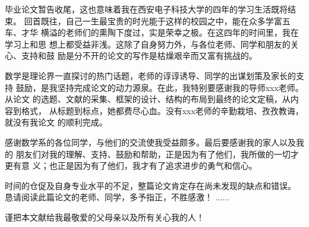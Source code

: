 
\begin{thanks}

毕业论文暂告收尾，这也意味着我在西安电子科技大学的四年的学习生活既将结束。
回首既往，自己一生最宝贵的时光能于这样的校园之中，能在众多学富五车、才华
横溢的老师们的熏陶下度过，实是荣幸之极。在这四年的时间里，我在学习上和思
想上都受益非浅。这除了自身努力外，与各位老师、同学和朋友的关心、支持和鼓
励是分不开的论文的写作是枯燥艰辛而又富有挑战的。

数学是理论界一直探讨的热门话题，老师的谆谆诱导、同学的出谋划策及家长的支持
鼓励，是我坚持完成论文的动力源泉。在此，我特别要感谢我的导师xxx老师。从论文
的选题、文献的采集、框架的设计、结构的布局到最终的论文定稿，从内容到格式，
从标题到标点，她都费尽心血。没有xxx老师的辛勤栽培、孜孜教诲，就没有我论文
的顺利完成。

感谢数学系的各位同学，与他们的交流使我受益颇多。最后要感谢我的家人以及我的
朋友们对我的理解、支持、鼓励和帮助，正是因为有了他们，我所做的一切才更有意
义；也正是因为有了他们，我才有了追求进步的勇气和信心。

时间的仓促及自身专业水平的不足，整篇论文肯定存在尚未发现的缺点和错误。
恳请阅读此篇论文的老师、同学，多予指正，不胜感激！
......

\vskip 18pt

谨把本文献给我最敬爱的父母亲以及所有关心我的人！

\end{thanks}
